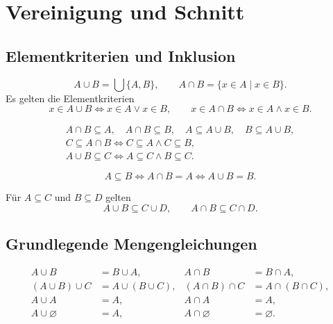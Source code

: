 \chapter{Vereinigung und Schnitt}

\section{Elementkriterien und Inklusion}

\begin{definition}
\[
 A\cup B=\bigcup\{A,B\},\qquad
 A\cap B=\{x\in A\mid x\in B\}.
\]
Es gelten die Elementkriterien
\[
 x\in A\cup B\Longleftrightarrow x\in A\lor x\in B,\qquad
 x\in A\cap B\Longleftrightarrow x\in A\land x\in B.
\]
\end{definition}

\begin{theorem}
\[
\begin{gathered}
 A\cap B\subseteq A,\quad A\cap B\subseteq B,\quad
 A\subseteq A\cup B,\quad B\subseteq A\cup B,\\
 C\subseteq A\cap B
       \Longleftrightarrow C\subseteq A\land C\subseteq B,\\
 A\cup B\subseteq C
       \Longleftrightarrow A\subseteq C\land B\subseteq C.
\end{gathered}
\]
\end{theorem}

\begin{theorem}
\[
 A\subseteq B
   \Longleftrightarrow A\cap B=A
   \Longleftrightarrow A\cup B=B.
\]
\end{theorem}

\begin{theorem}
Für $A\subseteq C$ und $B\subseteq D$ gelten
\[
 A\cup B\subseteq C\cup D,\qquad A\cap B\subseteq C\cap D.
\]
\end{theorem}

\section{Grundlegende Mengengleichungen}

\begin{theorem}
\[
\begin{aligned}
 A\cup B&=B\cup A,& A\cap B&=B\cap A,\\
 (A\cup B)\cup C&=A\cup(B\cup C),&
 (A\cap B)\cap C&=A\cap(B\cap C),\\
 A\cup A&=A,& A\cap A&=A,\\
 A\cup\varnothing&=A,& A\cap\varnothing&=\varnothing.
\end{aligned}
\]
\cite{rutgers}
\end{theorem}

